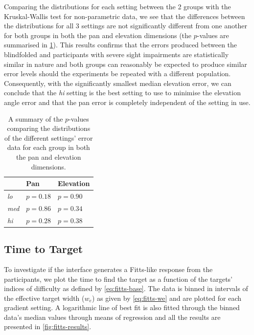 \documentclass{article}
\begin{document}
Comparing the distributions for each setting between the 2 groups with the Kruskal-Wallis test for non-parametric data, we see that the differences between the distributions for all 3 settings are not significantly different from one another for both groups in both the pan and elevation dimensions (the $p$-values are summarised in \cref{tab:inter-group-results}).
This results confirms that the errors produced between the blindfolded and participants with severe sight impairments are statistically similar in nature and both groups can reasonably be expected to produce similar error levels should the experiments be repeated with a different population. 
Consequently, with the significantly smallest median elevation error, we can conclude that the \textit{hi} setting is the best setting to use to minimise the elevation angle error and that the pan error is completely independent of the setting in use. 

\begin{table}
  \centering
  \caption{A summary of the $p$-values comparing the distributions of the different settings' error data for each group in both the pan and elevation dimensions. }\label{tab:inter-group-results}
  \begin{tabular}{lll}
    \toprule
                   & Pan      & Elevation \\ \midrule
      \textit{lo}  & $p=0.18$ & $p=0.90$  \\
      \textit{med} & $p=0.86$ & $p=0.34$  \\
      \textit{hi}  & $p=0.28$ & $p=0.38$  \\
    \bottomrule
  \end{tabular}
\end{table}

\subsection{Time to Target}

To investigate if the interface generates a Fitts-like response from the participants, we plot the time to find the target as a function of the targets' indices of difficulty as defined by \cref{eq:fitts-base}.
The data is binned in intervals of the effective target width ($w_e$) as given by \cref{eq:fitts-we} and are plotted for each gradient setting. 
A logarithmic line of best fit is also fitted through the binned data's median values through means of regression and all the results are presented in \cref{fig:fitts-results}.
\end{document}
